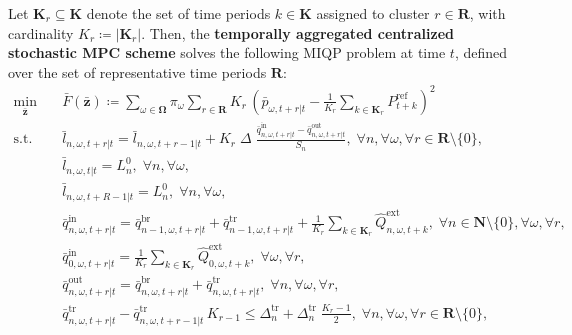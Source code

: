 \documentclass[a4paper,fleqn]{cas-sc}
\begin{document}
Let $\boldsymbol{K}_r \subseteq \boldsymbol{K}$ denote the set of time periods $k \in \boldsymbol{K}$ assigned to cluster $r \in \boldsymbol{R}$,
with cardinality $K_r \coloneqq |\boldsymbol{K}_r|$.
Then, the \textbf{temporally aggregated centralized stochastic MPC scheme} solves the following MIQP problem at time $t$, defined over the set of representative time periods $\boldsymbol{R}$:
\begin{subequations}
\label{eq:TSA_cen_sto_MPC}
\begin{align}
\min_{\boldsymbol{\bar{z}}} \quad &
\bar{F}(\boldsymbol{\bar{z}}) \coloneqq
\sum_{\omega \in \boldsymbol{\Omega}} \pi_{\omega} \sum_{r \in \boldsymbol{R}} K_r \, \left( \bar{p}_{\omega, t+r|t} - \frac{1}{K_r} \sum_{k \in \boldsymbol{K}_r} P^{\mathrm{ref}}_{t+k} \right)^2 \label{eq:TSA_cen_sto_obj}\\
\text{s.t.} \quad &
\bar{l}_{n, \omega, t+r | t} = \bar{l}_{n, \omega, t+r-1 | t} + K_r \; \Delta \; \frac{ \bar{q}^{\mathrm{in}}_{n, \omega, t+r | t} - \bar{q}^{\mathrm{out}}_{n, \omega, t+r | t}}{S_n}, \; \forall n, \forall \omega, \forall r \in \boldsymbol{R} \setminus \{0\},
\label{eq:TSA_cen_sto_water_level}\\
& \bar{l}_{n, \omega, t | t} = L^0_{n}, \; \forall n, \forall \omega,
\label{eq:TSA_cen_sto_water_level_init}\\
& \bar{l}_{n, \omega, t + R-1 | t} = L^0_{n}, \; \forall n, \forall \omega, \label{eq:TSA_cen_sto_water_level_final}\\
& \bar{q}^{\mathrm{in}}_{n, \omega, t+r | t} = \bar{q}^{\mathrm{br}}_{n-1, \omega, t+r | t} + \bar{q}^{\mathrm{tr}}_{n-1, \omega, t+r | t} + \frac{1}{K_r} \sum_{k \in \boldsymbol{K}_r} \hat{Q}^\mathrm{ext}_{n, \omega, t+k}, \; \forall n \in \boldsymbol{N} \setminus \{0\}, \forall \omega, \forall r,
\label{eq:TSA_cen_sto_inflow}\\
& \bar{q}^{\mathrm{in}}_{0, \omega, t+r | t} = \frac{1}{K_r} \sum_{k \in \boldsymbol{K}_r} \hat{Q}^\mathrm{ext}_{0, \omega, t+k}, \; \forall \omega, \forall r,
\label{eq:TSA_cen_sto_inflow_init}\\
& \bar{q}^{\mathrm{out}}_{n, \omega, t+r | t} = \bar{q}^{\mathrm{br}}_{n, \omega, t+r | t} + \bar{q}^{\mathrm{tr}}_{n, \omega, t+r | t}, \; \forall n, \forall \omega, \forall r,
\label{eq:TSA_cen_sto_outflow}\\
& \bar{q}^{\mathrm{tr}}_{n, \omega, t+r|t} - \bar{q}^{\mathrm{tr}}_{n, \omega, t+r-1|t} \, K_{r-1} \leq
\Delta^{\mathrm{tr}}_{n} + \Delta^{\mathrm{tr}}_{n} \; \frac{K_r - 1}{2}, \; \forall n, \forall \omega, \forall r \in \boldsymbol{R} \setminus \{0\}, 

\end{align}
\end{subequations}
\end{document}
